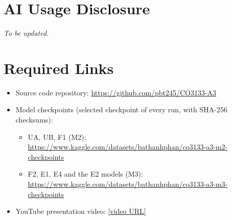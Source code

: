 \section*{AI Usage Disclosure}
\label{sec:ai-disclosure}

\textit{To be updated.}

\section*{Required Links}
\label{sec:links}

\begin{itemize}
  \item Source code repository: \url{https://github.com/pbt245/CO3133-A3}
  \item Model checkpoints (selected checkpoint of every run, with SHA-256 checksums):
        \begin{itemize}
          \item UA, UB, F1 (M2): \url{https://www.kaggle.com/datasets/bathanhphan/co3133-a3-m2-checkpoints}
          \item F2, E1, E4 and the E2 models (M3): \url{https://www.kaggle.com/datasets/bathanhphan/co3133-a3-m3-checkpoints}
        \end{itemize}
  \item YouTube presentation video: \url{[video URL]}
\end{itemize}
